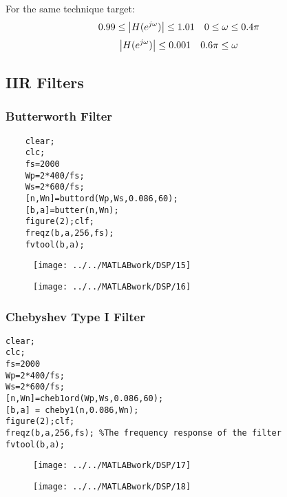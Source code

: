 \documentclass[12pt,a4paper]{article}
\begin{document}
For the same technique target:
$$0.99\leq\abs{H(e^{j\omega})}\leq 1.01 \quad  0\leq \omega\leq 0.4\pi$$
$$\abs{H(e^{j\omega})}\leq 0.001 \quad 0.6\pi \leq \omega$$
\subsection{IIR Filters} 
\subsubsection{Butterworth Filter}
\begin{lstlisting}
	clear;
	clc;
	fs=2000
	Wp=2*400/fs;
	Ws=2*600/fs;
	[n,Wn]=buttord(Wp,Ws,0.086,60);
	[b,a]=butter(n,Wn);
	figure(2);clf;
	freqz(b,a,256,fs);
	fvtool(b,a);
\end{lstlisting}
\begin{figure}[htbp]
	\centering
	\begin{minipage}[h]{0.48\textwidth}
		\centering
		\texttt{[image: ../../MATLABwork/DSP/15]}
	\end{minipage}
	\begin{minipage}[htbp]{0.48\textwidth}
		\centering
		\texttt{[image: ../../MATLABwork/DSP/16]}
	\end{minipage}
\end{figure}
\subsubsection{Chebyshev Type I Filter}
\begin{lstlisting}
clear;
clc;
fs=2000
Wp=2*400/fs;
Ws=2*600/fs;
[n,Wn]=cheb1ord(Wp,Ws,0.086,60);
[b,a] = cheby1(n,0.086,Wn);
figure(2);clf;
freqz(b,a,256,fs); %The frequency response of the filter
fvtool(b,a);
\end{lstlisting}
\begin{figure}[htbp]
	\centering
	\begin{minipage}[h]{0.48\textwidth}
		\centering
		\texttt{[image: ../../MATLABwork/DSP/17]}
	\end{minipage}
	\begin{minipage}[htbp]{0.48\textwidth}
		\centering
		\texttt{[image: ../../MATLABwork/DSP/18]}
	\end{minipage}
\end{figure}
\end{document}
